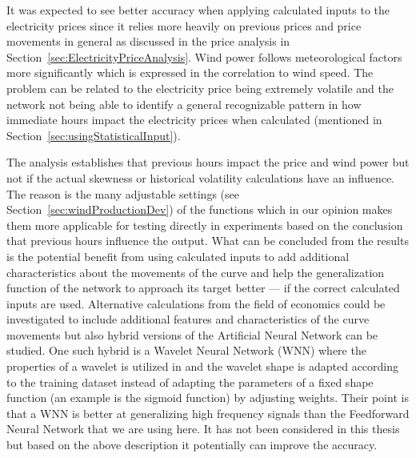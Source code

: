 It was expected to see better accuracy when applying calculated inputs to the electricity prices since it relies more heavily on previous prices and price movements in general as discussed in the price analysis in Section~\ref{sec:ElectricityPriceAnalysis}. Wind power follows meteorological factors more significantly which is expressed in the correlation to wind speed. The problem can be related to the electricity price being extremely volatile and the network not being able to identify a general recognizable pattern in how immediate hours impact the electricity prices when calculated (mentioned in Section~\ref{sec:usingStatisticalInput}).

The analysis establishes that previous hours impact the price and wind power but not if the actual skewness or historical volatility calculations have an influence. The reason is the many adjustable settings (see Section~\ref{sec:windProductionDev}) of the functions which in our opinion makes them more applicable for testing directly in experiments based on the conclusion that previous hours influence the output. What can be concluded from the results is the potential benefit from using calculated inputs to add additional characteristics about the movements of the curve and help the generalization function of the network to approach its target better --- if the correct calculated inputs are used. Alternative calculations from the field of economics could be investigated to include additional features and characteristics of the curve movements but also hybrid versions of the Artificial Neural Network can be studied. One such hybrid is a Wavelet Neural Network (WNN) where the properties of a wavelet is utilized in \cite{adaptiveWaveletANNElectricityMarkets} and the wavelet shape is adapted according to the training dataset instead of adapting the parameters of a fixed shape function (an example is the sigmoid function) by adjusting weights. Their point is that a WNN is better at generalizing high frequency signals than the Feedforward Neural Network that we are using here. It has not been considered in this thesis but based on the above description it potentially can improve the accuracy.